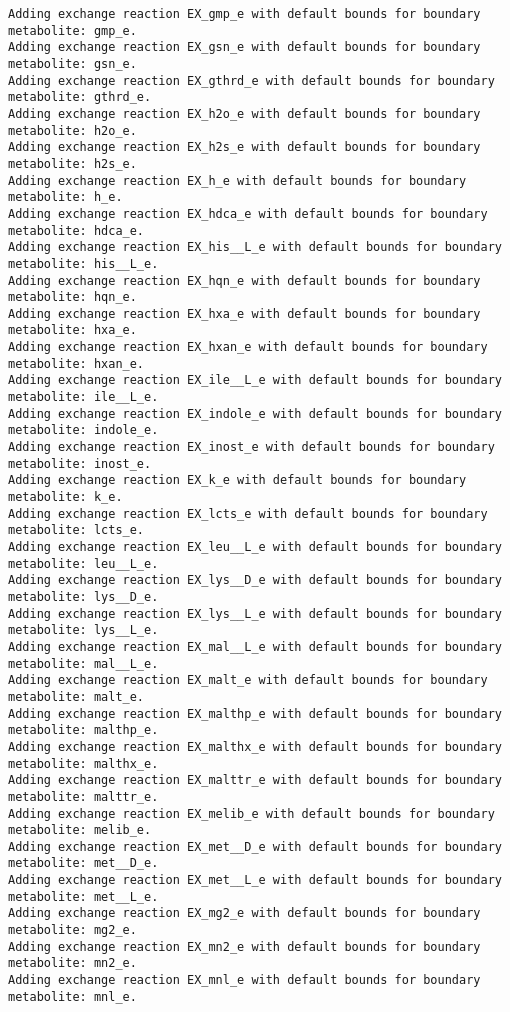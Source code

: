 \documentclass[
  letterpaper,
  DIV=11,
  numbers=noendperiod]{scrartcl}
\begin{document}
\begin{verbatim}
Adding exchange reaction EX_gmp_e with default bounds for boundary metabolite: gmp_e.
Adding exchange reaction EX_gsn_e with default bounds for boundary metabolite: gsn_e.
Adding exchange reaction EX_gthrd_e with default bounds for boundary metabolite: gthrd_e.
Adding exchange reaction EX_h2o_e with default bounds for boundary metabolite: h2o_e.
Adding exchange reaction EX_h2s_e with default bounds for boundary metabolite: h2s_e.
Adding exchange reaction EX_h_e with default bounds for boundary metabolite: h_e.
Adding exchange reaction EX_hdca_e with default bounds for boundary metabolite: hdca_e.
Adding exchange reaction EX_his__L_e with default bounds for boundary metabolite: his__L_e.
Adding exchange reaction EX_hqn_e with default bounds for boundary metabolite: hqn_e.
Adding exchange reaction EX_hxa_e with default bounds for boundary metabolite: hxa_e.
Adding exchange reaction EX_hxan_e with default bounds for boundary metabolite: hxan_e.
Adding exchange reaction EX_ile__L_e with default bounds for boundary metabolite: ile__L_e.
Adding exchange reaction EX_indole_e with default bounds for boundary metabolite: indole_e.
Adding exchange reaction EX_inost_e with default bounds for boundary metabolite: inost_e.
Adding exchange reaction EX_k_e with default bounds for boundary metabolite: k_e.
Adding exchange reaction EX_lcts_e with default bounds for boundary metabolite: lcts_e.
Adding exchange reaction EX_leu__L_e with default bounds for boundary metabolite: leu__L_e.
Adding exchange reaction EX_lys__D_e with default bounds for boundary metabolite: lys__D_e.
Adding exchange reaction EX_lys__L_e with default bounds for boundary metabolite: lys__L_e.
Adding exchange reaction EX_mal__L_e with default bounds for boundary metabolite: mal__L_e.
Adding exchange reaction EX_malt_e with default bounds for boundary metabolite: malt_e.
Adding exchange reaction EX_malthp_e with default bounds for boundary metabolite: malthp_e.
Adding exchange reaction EX_malthx_e with default bounds for boundary metabolite: malthx_e.
Adding exchange reaction EX_malttr_e with default bounds for boundary metabolite: malttr_e.
Adding exchange reaction EX_melib_e with default bounds for boundary metabolite: melib_e.
Adding exchange reaction EX_met__D_e with default bounds for boundary metabolite: met__D_e.
Adding exchange reaction EX_met__L_e with default bounds for boundary metabolite: met__L_e.
Adding exchange reaction EX_mg2_e with default bounds for boundary metabolite: mg2_e.
Adding exchange reaction EX_mn2_e with default bounds for boundary metabolite: mn2_e.
Adding exchange reaction EX_mnl_e with default bounds for boundary metabolite: mnl_e.

\end{verbatim}
\end{document}
